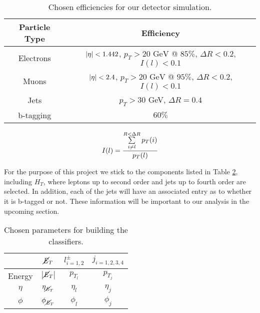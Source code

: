 \begin{table}[htbp]
    \centering
    \begin{tabular}{c|c}
    \toprule
    Particle Type & Efficiency \\
    \midrule
    \rowcolor{gray!6} Electrons & $\abs{\eta} < 1.442$, $p_T > 20\text{ GeV}$ @ $85\%$, $\Delta R <0.2$, $I(l) <0.1$\\
    Muons & $\abs{\eta} < 2.4$, $p_T > 20\text{ GeV}$ @ $95\%$, $\Delta R < 0.2$, $I(l) <0.1$\\
    \rowcolor{gray!6} Jets & $p_T>30$ GeV, $\Delta R = 0.4$\\
    b-tagging & $60\%$ \\
    \bottomrule
    \end{tabular}
    \caption{Chosen efficiencies for our detector simulation.} 
    \label{tab:efficiencies}    
\end{table}

\begin{equation}
    I(l) = \frac{\sum\limits_{i\ne l}^{R<\Delta R} p_T(i)}{p_T(l)} \\
    \label{eq:iso}
\end{equation}


For the purpose of this project we stick to the components listed in Table \ref{tab:variables}, including $H_T$, where leptons up to second order and jets up to fourth order are selected. In addition, each of the jets will have an associated entry as to whether it is b-tagged or not. These information will be important to our analysis in the upcoming section. \\ 


\begin{table}[htbp]
    \centering
    \begin{tabular}{c|c|c|c} 
    \toprule
     & $\cancel{\it{E}}_{T}$ & $l^{\pm}_{i=1,2}$ & $j_{i=1,2,3,4}$ \\
    \midrule
    \rowcolor{gray!6} Energy & $\abs{\cancel{\it{E}}_{T}}$ & $ p_{T_l} $ & $ p_{T_j} $ \\
    $\eta$ & $\eta_{\cancel{\it{E}}_{T}}$ & $ \eta_l $ & $ \eta_j $ \\
    \rowcolor{gray!6} $\phi$ & $\phi_{\cancel{\it{E}}_{T}}$ & $ \phi_l $ & $ \phi_j $ \\
    \bottomrule
    \end{tabular}
    \caption{Chosen parameters for building the classifiers.} 
    \label{tab:variables}
\end{table}

